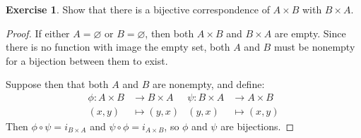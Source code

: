 \documentclass[11pt,a4paper,twoside]{article}
\theoremstyle{definition}
\newcounter{excounter}
\newtheorem{exercise}[excounter]{Exercise}
\begin{document}
\begin{exercise}

Show that there is a bijective correspondence of $A \times B$ with $B \times A$.

\end{exercise}

\begin{proof}

  If either $A = \varnothing$ or $B = \varnothing$, then both $A \times B$ and $B \times A$ are empty.
  Since there is no function with image the empty set, both $A$ and $B$ must be nonempty for a bijection between them to exist.

  Suppose then that both $A$ and $B$ are nonempty, and define:
  \begin{align*}
    \phi : A \times B &\to B \times A &\psi : B \times A &\to A \times B \\
    (x, y) &\mapsto (y, x) & (y, x) &\mapsto (x, y)
  \end{align*}
  Then $\phi \circ \psi = i_{B \times A}$ and $\psi \circ \phi = i_{A \times B}$, so $\phi$ and $\psi$ are bijections.

\end{proof}
\end{document}
